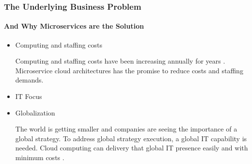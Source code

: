 \begin{frame}
  \frametitle{The Underlying Business Problem}
  \framesubtitle{And Why Microservices are the Solution}
  \begin{itemize}
    \item<1-> Computing and staffing costs

           {\scriptsize{Computing and staffing costs have been increasing annually for years \parencite{gartnerGlobalInformationTechnology2021,gartnerTrendsImpactingCloud2020}. Microservice cloud architectures has the promise to reduce costs and staffing demands.  }}

    \item<2-> IT Focus


    \item<3-> Globalization

           {\scriptsize{The world is getting smaller and companies are seeing the importance of a global strategy. To address global strategy execution, a global IT capability is needed. Cloud computing can delivery that global IT presence easily and with minimum costs \parencite{pricewaterhousecooperHowAdvancedDigital}.}}



  \end{itemize}
\end{frame}
